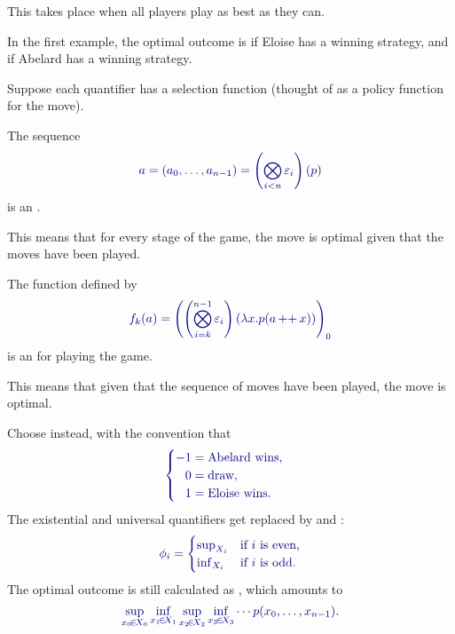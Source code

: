 \documentclass%
[%
Screen4to3,
]{foils}
\begin{document}
\vfill

This takes place
when all players play as best as they can.  

In the first example, the optimal outcome is
 if Eloise has a winning strategy, and
 if Abelard has a winning strategy.


Suppose each quantifier  has a selection function
 (thought of as a policy function for the
 move).

\vfill

The sequence \[ \darkblue{a = (a_0,\dots,a_{n-1}) = \left(\bigotimes_{i < n}
    \varepsilon_i\right)(p)}\] is an . 

\vfill

This means that for every stage  of the game, the move
 is optimal given that the moves
 have been played.


The function  defined by %
        \[
        \darkblue{f_k(a) = \left(\left(\bigotimes_{i=k}^{n-1}
    \varepsilon_i\right)(\lambda x.p(a \concat x))\right)_0}
        \]
    is an  for playing the game. 

\vfill

This means that given that the sequence of moves
 have been played, the move
 is optimal.

    
Choose 
instead, with the convention that 
\[
\darkblue{\begin{cases}
 -1 = \text{Abelard wins,} & \\
 \phantom{-}0 = \text{draw}, & \\
 \phantom{-}1 = \text{Eloise wins.} & 
\end{cases}}
\]
The existential and universal quantifiers get
replaced by \darkblue{$\sup$} and \darkblue{$\inf$}:
\[
  \darkblue{\phi_i =  
  \begin{cases}
    \sup_{X_i} & \text{if $i$ is even,} \\
    \inf_{X_i} & \text{if $i$ is odd.} 
  \end{cases}}
\]
The optimal outcome is still calculated as , which %
amounts to
\[
\darkblue{\darkblue{\sup_{x_0 \!\in\! X_0} \inf_{x_1 \!\in\! X_1}\sup_{x_{2} \!\in\! X_{2}} \inf_{x_{3} \!\in\! X_{3}} \cdots p(x_0, \ldots, x_{n-1})}}.
\]
\end{document}
